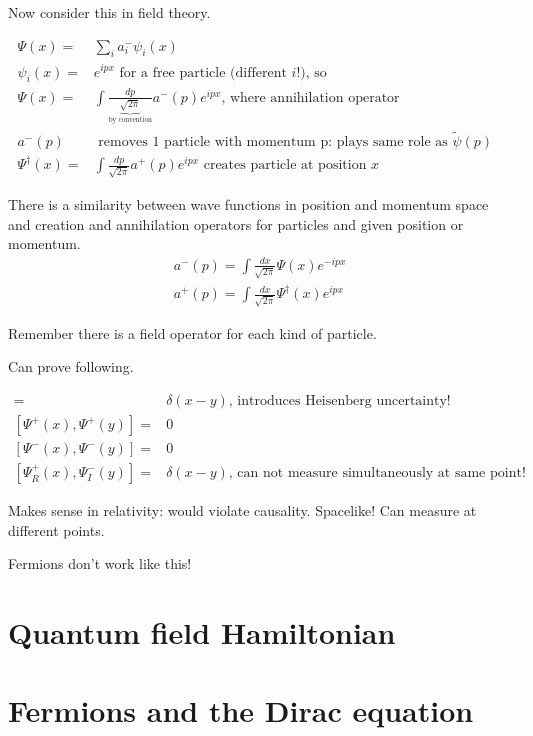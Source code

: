 \documentclass[]{article}
\begin{document}
Now consider this in field theory.

\begin{align*}
\Psi(x) =& \sum_{i} a^-_i \psi_i(x)\\
\psi_i(x) =& e^{ipx} \text{ for a free particle (different $i$!), so} \\
\Psi(x)=& \int \frac{dp}{\underbrace{\sqrt{2\pi}}_\text{by convention}} a^-(p) e^{ipx} \text{, where annihilation operator}\\
a^-(p)& \text{ removes 1 particle with momentum p: plays same role as $\widetilde{\psi}(p)$ }\\
\Psi^\dagger(x)=& \int \frac{dp}{\sqrt{2\pi}} a^+(p) e^{ipx} \text{ creates particle at position $x$}
\end{align*}

There is a similarity between wave functions in position and momentum space and creation and annihilation operators for particles and given position or momentum.
\begin{align*}
a^-(p) = \int \frac{dx}{\sqrt{2\pi}} \Psi(x) e^{-ipx}\\
a^+(p) = \int \frac{dx}{\sqrt{2\pi}} \Psi^\dagger(x) e^{ipx}
\end{align*}

Remember there is a field operator for each kind of particle.

Can prove following.
 
\begin{align*}
[\Psi^+(x),\Psi^-(y)] =& \delta(x-y) \text{, introduces Heisenberg uncertainty!}\\
[\Psi^+(x),\Psi^+(y)] =&0\\
[\Psi^-(x),\Psi^-(y)] =&0\\
[\Psi^+_R(x),\Psi^-_I(y)] =& \delta(x-y) \text{, can not measure simultaneously at same point!}
\end{align*}

Makes sense in relativity: would violate causality. Spacelike! Can measure at different points.

Fermions don't work like this!

\section{Quantum field Hamiltonian}

\section{Fermions and the Dirac equation}
\end{document}
